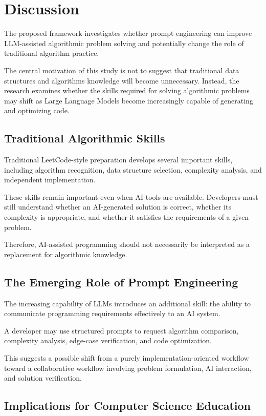 \section{Discussion}

The proposed framework investigates whether prompt engineering can improve
LLM-assisted algorithmic problem solving and potentially change the role of
traditional algorithm practice.

The central motivation of this study is not to suggest that traditional data
structures and algorithms knowledge will become unnecessary. Instead, the
research examines whether the skills required for solving algorithmic problems
may shift as Large Language Models become increasingly capable of generating
and optimizing code.

\subsection{Traditional Algorithmic Skills}

Traditional LeetCode-style preparation develops several important skills,
including algorithm recognition, data structure selection, complexity analysis,
and independent implementation.

These skills remain important even when AI tools are available. Developers must
still understand whether an AI-generated solution is correct, whether its
complexity is appropriate, and whether it satisfies the requirements of a
given problem.

Therefore, AI-assisted programming should not necessarily be interpreted as a
replacement for algorithmic knowledge.

\subsection{The Emerging Role of Prompt Engineering}

The increasing capability of LLMs introduces an additional skill: the ability
to communicate programming requirements effectively to an AI system.

A developer may use structured prompts to request algorithm comparison,
complexity analysis, edge-case verification, and code optimization.

This suggests a possible shift from a purely implementation-oriented workflow
toward a collaborative workflow involving problem formulation, AI interaction,
and solution verification.

\subsection{Implications for Computer Science Education}

